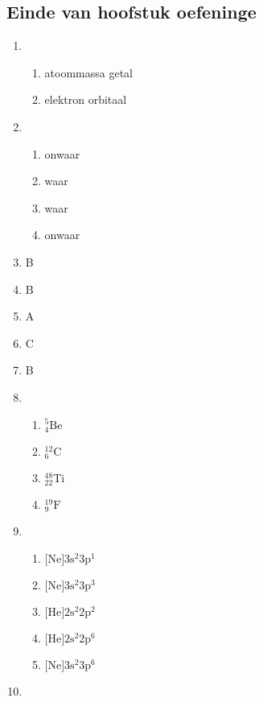 \subsection{Einde van hoofstuk oefeninge} 
\begin{multicols}{4}
\begin{enumerate}[noitemsep, label=\textbf{\arabic*}. ] 
\item %
    \begin{enumerate}[noitemsep, label=\textbf{(\alph*)} ]
    \item atoommassa getal
    \item elektron orbitaal
    \end{enumerate}
\item %
    \begin{enumerate}[noitemsep, label=\textbf{(\alph*)} ]
    \item onwaar
    \item waar
    \item waar
    \item onwaar
    \end{enumerate}
    \item B
    \item B
    \item A
    \item C
    \item B
\item %
    \begin{enumerate}[noitemsep, label=\textbf{(\alph*)} ]
    \item $^{5}_{4}\text{Be}$
    \item $^{12}_{6}\text{C}$
    \item $^{48}_{22}\text{Ti}$
    \item $^{19}_{9}\text{F}$
    \end{enumerate}
\item %
    \begin{enumerate}[noitemsep, label=\textbf{(\alph*)} ]
    \item $\text{[Ne]} 3\text{s}^2 3\text{p}^1$
    \item $\text{[Ne]} 3\text{s}^2 3\text{p}^3$
    \item $\text{[He]} 2\text{s}^2 2\text{p}^2$
    \item $\text{[He]} 2\text{s}^2 2\text{p}^6$
    \item $\text{[Ne]} 3\text{s}^2 3\text{p}^6$
    \end{enumerate}
\item %

\end{enumerate}
\end{multicols}
